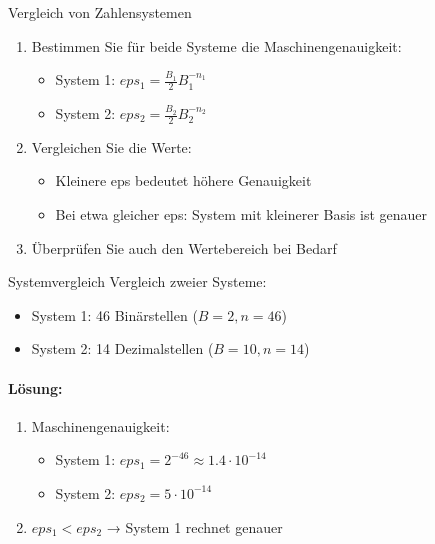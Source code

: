 \begin{KR}{Vergleich von Zahlensystemen}
\begin{enumerate}
    \item Bestimmen Sie für beide Systeme die Maschinengenauigkeit:
    \begin{itemize}
        \item System 1: $eps_1 = \frac{B_1}{2}B_1^{-n_1}$ 
        \item System 2: $eps_2 = \frac{B_2}{2}B_2^{-n_2}$
    \end{itemize}
    \item Vergleichen Sie die Werte:
    \begin{itemize}
        \item Kleinere eps bedeutet höhere Genauigkeit
        \item Bei etwa gleicher eps: System mit kleinerer Basis ist genauer
    \end{itemize}
    \item Überprüfen Sie auch den Wertebereich bei Bedarf
\end{enumerate}
\end{KR}

\begin{example2}{Systemvergleich}
Vergleich zweier Systeme:
\begin{itemize}
    \item System 1: 46 Binärstellen ($B=2, n=46$)
    \item System 2: 14 Dezimalstellen ($B=10, n=14$)
\end{itemize}
\paragraph{Lösung:}
\begin{enumerate}
    \item Maschinengenauigkeit:
    \begin{itemize}
        \item System 1: $eps_1 = 2^{-46} \approx 1.4 \cdot 10^{-14}$
        \item System 2: $eps_2 = 5 \cdot 10^{-14}$
    \end{itemize}
    \item $eps_1 < eps_2$ → System 1 rechnet genauer
\end{enumerate}
\end{example2}

